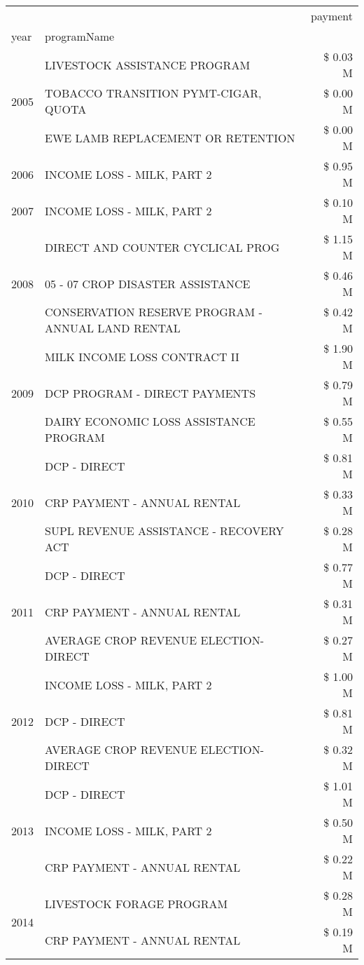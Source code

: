 \begin{tabular}{llr}
\toprule
 &  & payment \\
year & programName &  \\
\midrule
\multirow[t]{3}{*}{2005} & LIVESTOCK ASSISTANCE PROGRAM & \$ 0.03 M \\
 & TOBACCO TRANSITION PYMT-CIGAR, QUOTA & \$ 0.00 M \\
 & EWE LAMB REPLACEMENT OR RETENTION & \$ 0.00 M \\
\cline{1-3}
2006 & INCOME LOSS - MILK, PART 2 & \$ 0.95 M \\
\cline{1-3}
2007 & INCOME LOSS - MILK, PART 2 & \$ 0.10 M \\
\cline{1-3}
\multirow[t]{3}{*}{2008} & DIRECT AND COUNTER CYCLICAL PROG & \$ 1.15 M \\
 & 05 - 07 CROP DISASTER ASSISTANCE & \$ 0.46 M \\
 & CONSERVATION RESERVE PROGRAM - ANNUAL LAND RENTAL & \$ 0.42 M \\
\cline{1-3}
\multirow[t]{3}{*}{2009} & MILK INCOME LOSS CONTRACT II & \$ 1.90 M \\
 & DCP PROGRAM - DIRECT PAYMENTS & \$ 0.79 M \\
 & DAIRY ECONOMIC LOSS ASSISTANCE PROGRAM & \$ 0.55 M \\
\cline{1-3}
\multirow[t]{3}{*}{2010} & DCP - DIRECT & \$ 0.81 M \\
 & CRP PAYMENT - ANNUAL RENTAL & \$ 0.33 M \\
 & SUPL REVENUE ASSISTANCE - RECOVERY ACT & \$ 0.28 M \\
\cline{1-3}
\multirow[t]{3}{*}{2011} & DCP - DIRECT & \$ 0.77 M \\
 & CRP PAYMENT - ANNUAL RENTAL & \$ 0.31 M \\
 & AVERAGE CROP REVENUE ELECTION-DIRECT & \$ 0.27 M \\
\cline{1-3}
\multirow[t]{3}{*}{2012} & INCOME LOSS - MILK, PART 2 & \$ 1.00 M \\
 & DCP - DIRECT & \$ 0.81 M \\
 & AVERAGE CROP REVENUE ELECTION-DIRECT & \$ 0.32 M \\
\cline{1-3}
\multirow[t]{3}{*}{2013} & DCP - DIRECT & \$ 1.01 M \\
 & INCOME LOSS - MILK, PART 2 & \$ 0.50 M \\
 & CRP PAYMENT - ANNUAL RENTAL & \$ 0.22 M \\
\cline{1-3}
\multirow[t]{3}{*}{2014} & LIVESTOCK FORAGE PROGRAM & \$ 0.28 M \\
 & CRP PAYMENT - ANNUAL RENTAL & \$ 0.19 M \\

\end{tabular}

